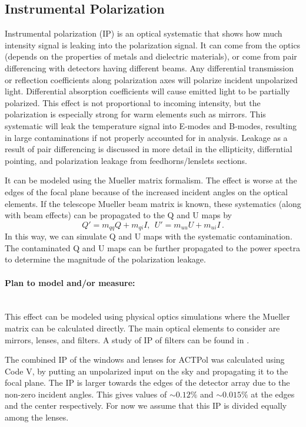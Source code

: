 \subsection{Instrumental Polarization} 
\label{instrumental_polarization}

Instrumental polarization (IP) is an optical systematic that shows how much intensity signal is leaking into the polarization signal. It can come from the optics (depends on the properties of metals and dielectric materials), or come from pair differencing with detectors having different beams. Any differential transmission or reflection coefficients along polarization axes will polarize incident unpolarized light. 
Differential absorption coefficients will cause emitted light to be partially polarized. This effect is not proportional to incoming intensity, but the polarization is especially strong for warm elements such as mirrors.
This systematic will leak the temperature signal into E-modes and B-modes, resulting in large contaminations if not properly accounted for in analysis. Leakage as a result of pair differencing is discussed in more detail in the ellipticity, differntial pointing, and polarization leakage from feedhorns/lenslets sections.

It can be modeled using the Mueller matrix formalism. The effect is worse at the edges of the focal plane because of the increased incident angles on the optical elements. If the telescope Mueller beam matrix is known, these systematics (along with beam effects) can be propagated to the Q and U maps by
\begin{equation}
Q' = m_{qq} Q + m_{qi} I, \ \ U' = m_{uu} U + m_{ui} I \, .
\end{equation}
In this way, we can simulate Q and U maps with the systematic contamination. The contaminated Q and U maps can be further propagated to the power spectra to determine the magnitude of the polarization leakage.

\paragraph{Plan to model and/or measure:} \mbox{}\\

This effect can be modeled using physical optics simulations where the Mueller matrix can be calculated directly. 
The main optical elements to consider are mirrors, lenses, and filters.
A study of IP of filters can be found in \cite{pisano2005}.

The combined IP of the windows and lenses for ACTPol was calculated using Code V, 
by putting an unpolarized input on the sky and propagating it to the focal plane.
The IP is larger towards the edges of the detector array due to the non-zero incident angles.
This gives values of $\sim0.12\%$ and $\sim0.015\%$ at the edges and the center respectively.
For now we assume that this IP is divided equally among the lenses. 




